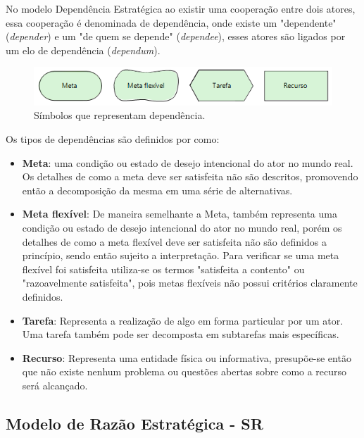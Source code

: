 No modelo Dependência Estratégica ao existir uma cooperação entre dois atores, essa cooperação é denominada de dependência, onde existe um "dependente" (\textit{depender}) e um "de quem se depende" (\textit{dependee}), esses atores são ligados por um elo de dependência (\textit{dependum}). 

\begin{figure}[h!]
	\centering
	\includegraphics[keepaspectratio=true,scale=1.0]{figuras/TiposDeContribuicao.png}
	\caption{Símbolos que representam dependência.}
	\label{dependenciaIstar}
\end{figure} 

Os tipos de dependências são definidos por \cite{istarwiki20} como: 

\begin{itemize}
	\item \textbf{Meta}: uma condição ou estado de desejo intencional do ator no mundo real. Os detalhes de como a meta deve ser satisfeita não são descritos, promovendo então a decomposição da mesma em uma série de alternativas.   
	\item \textbf{Meta flexível}: De maneira semelhante a Meta, também representa uma condição ou estado de desejo intencional do ator no mundo real, porém os detalhes de como a meta flexível deve ser satisfeita não são definidos a princípio, sendo então sujeito a interpretação. Para verificar se uma meta flexível foi satisfeita utiliza-se os termos "satisfeita a contento" ou "razoavelmente satisfeita", pois metas flexíveis não possui critérios claramente definidos. 
	\item \textbf{Tarefa}: Representa a realização de algo em forma particular por um ator. Uma tarefa também pode ser decomposta em subtarefas mais específicas. 
	\item \textbf{Recurso}: Representa uma entidade física ou informativa, presupõe-se então que não existe nenhum problema ou questões abertas sobre como a recurso será alcançado. 
\end{itemize}





\subsection{Modelo de Razão Estratégica - SR}
\label{subsec:SR}

